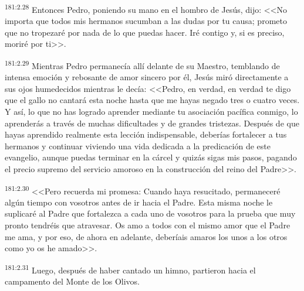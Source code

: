 \par 
\textsuperscript{181:2.28} Entonces Pedro, poniendo su mano en el hombro de Jesús, dijo: <<No importa que todos mis hermanos sucumban a las dudas por tu causa; prometo que no tropezaré por nada de lo que puedas hacer. Iré contigo y, si es preciso, moriré por ti>>.

\par 
\textsuperscript{181:2.29} Mientras Pedro permanecía allí delante de su Maestro, temblando de intensa emoción y rebosante de amor sincero por él, Jesús miró directamente a sus ojos humedecidos mientras le decía: <<Pedro, en verdad, en verdad te digo que el gallo no cantará esta noche hasta que me hayas negado tres o cuatro veces. Y así, lo que no has logrado aprender mediante tu asociación pacífica conmigo, lo aprenderás a través de muchas dificultades y de grandes tristezas. Después de que hayas aprendido realmente esta lección indispensable, deberías fortalecer a tus hermanos y continuar viviendo una vida dedicada a la predicación de este evangelio, aunque puedas terminar en la cárcel y quizás sigas mis pasos, pagando el precio supremo del servicio amoroso en la construcción del reino del Padre>>.

\par 
\textsuperscript{181:2.30} <<Pero recuerda mi promesa: Cuando haya resucitado, permaneceré algún tiempo con vosotros antes de ir hacia el Padre. Esta misma noche le suplicaré al Padre que fortalezca a cada uno de vosotros para la prueba que muy pronto tendréis que atravesar. Os amo a todos con el mismo amor que el Padre me ama, y por eso, de ahora en adelante, deberíais amaros los unos a los otros como yo os he amado>>.

\par 
\textsuperscript{181:2.31} Luego, después de haber cantado un himno, partieron hacia el campamento del Monte de los Olivos.